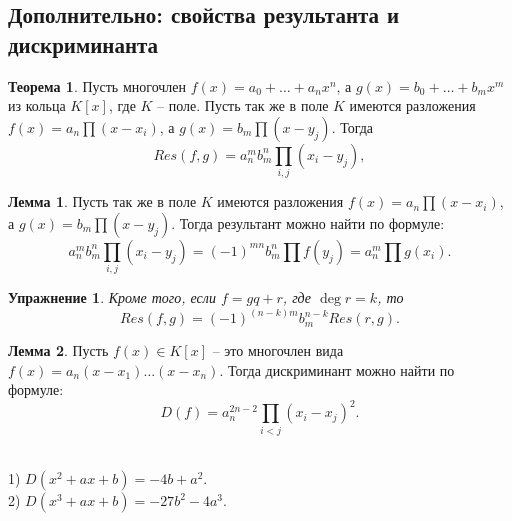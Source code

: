 \documentclass[10pt,a4paper,oneside]{book}
\newtheorem{uprz}{\color{violet!100!black} Упражнение}
\theoremstyle{definition}
\newtheorem{thm}{\color{red!40!black}Теорема}
\newtheorem{lem}{\color{green!50!black}Лемма}
\def\exm{\noindent {\bf Примеры:}}
\def\thrm{\begin{thm}}
\def\ethrm{\end{thm}}
\def\lm{\begin{lem}}
\def\elm{\end{lem}}
\def\upr{\begin{uprz}}
\def\eupr{\end{uprz}}
\begin{document}
\subsection{Дополнительно: свойства результанта и дискриминанта}

\thrm Пусть многочлен $f(x)=a_0+\dots+a_nx^n$, а $g(x)=b_0+\dots+b_mx^m$ из кольца $K[x]$, где $K$ -- поле. Пусть так же в поле $K$ имеются разложения $f(x)=a_n\prod(x-x_i)$, а $g(x)=b_m\prod (x-y_j)$. Тогда
$$Res(f,g)=a_n^mb_m^n \prod_{i,j} (x_i-y_j),$$
\ethrm

\lm Пусть так же в поле $K$ имеются разложения $f(x)=a_n\prod(x-x_i)$, а $g(x)=b_m\prod (x-y_j)$. Тогда результант можно найти по формуле:
$$a_n^mb_m^n \prod_{i,j} (x_i-y_j)=(-1)^{mn}b_m^n \prod f(y_j)=a_n^m \prod g(x_i).$$ 
\elm

\upr Кроме того, если $f=gq+r$, где $\deg r=k$, то 
 $$Res(f,g)=(-1)^{(n-k)m}b_m^{n-k} Res(r,g).$$
\eupr

\lm Пусть $f(x)\in K[x]$ -- это многочлен вида $f(x)=a_n(x-x_1)\dots(x-x_n)$. Тогда дискриминант можно найти по формуле:
$$D(f)=a_n^{2n-2}\prod_{i< j} (x_i-x_j)^2.$$
\elm

\exm\\
1) $D(x^2+ax+b)=-4b+a^2$.\\
2) $D(x^3+ax+b)=-27b^2-4a^3$.\\
\end{document}
